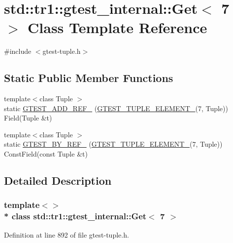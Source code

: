 \hypertarget{classstd_1_1tr1_1_1gtest__internal_1_1_get_3_017_01_4}{}\section{std\+:\+:tr1\+:\+:gtest\+\_\+internal\+:\+:Get$<$ 7 $>$ Class Template Reference}
\label{classstd_1_1tr1_1_1gtest__internal_1_1_get_3_017_01_4}


{\ttfamily \#include $<$gtest-\/tuple.\+h$>$}

\subsection*{Static Public Member Functions}
\begin{DoxyCompactItemize}
\item 
{\footnotesize template$<$class Tuple $>$ }\\static \hyperlink{classstd_1_1tr1_1_1gtest__internal_1_1_get_3_017_01_4_ae1245f00b2ad610a130681b5bc81051c}{G\+T\+E\+S\+T\+\_\+\+A\+D\+D\+\_\+\+R\+E\+F\+\_\+} (\hyperlink{gtest-tuple_8h_a1b7f133d8aa02e0b7afed7b66781eeb7}{G\+T\+E\+S\+T\+\_\+\+T\+U\+P\+L\+E\+\_\+\+E\+L\+E\+M\+E\+N\+T\+\_\+}(7, Tuple)) Field(Tuple \&t)
\item 
{\footnotesize template$<$class Tuple $>$ }\\static \hyperlink{classstd_1_1tr1_1_1gtest__internal_1_1_get_3_017_01_4_afb7bd56e0697304325cd157d11df4a7b}{G\+T\+E\+S\+T\+\_\+\+B\+Y\+\_\+\+R\+E\+F\+\_\+} (\hyperlink{gtest-tuple_8h_a1b7f133d8aa02e0b7afed7b66781eeb7}{G\+T\+E\+S\+T\+\_\+\+T\+U\+P\+L\+E\+\_\+\+E\+L\+E\+M\+E\+N\+T\+\_\+}(7, Tuple)) Const\+Field(const Tuple \&t)
\end{DoxyCompactItemize}


\subsection{Detailed Description}
\subsubsection*{template$<$$>$\\*
class std\+::tr1\+::gtest\+\_\+internal\+::\+Get$<$ 7 $>$}



Definition at line 892 of file gtest-\/tuple.\+h.



